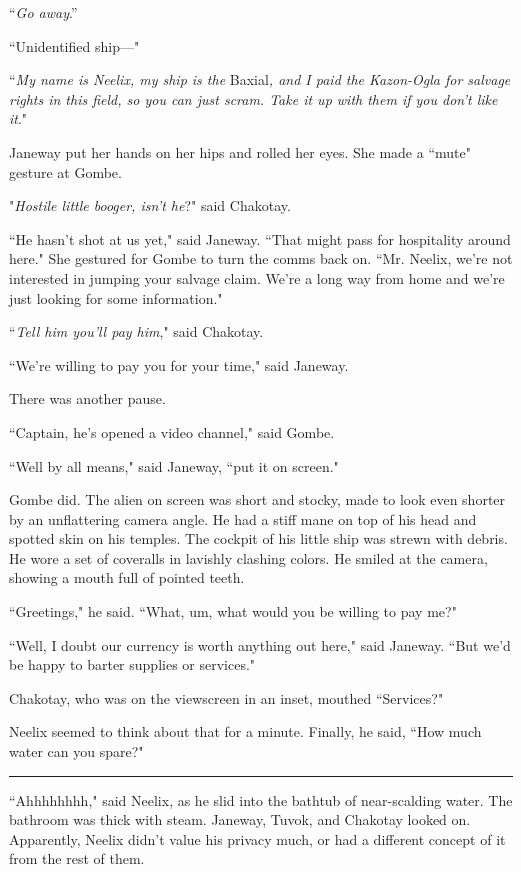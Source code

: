 \documentclass[twoside,letterpaper,12pt]{memoir}
\begin{document}
``\textit{Go away}.''

``Unidentified ship---"

``\textit{My name is Neelix, my ship is the }Baxial\textit{, and I paid the Kazon-Ogla for salvage rights in this field, so you can just scram. Take it up with them if you don't like it}."

Janeway put her hands on her hips and rolled her eyes. She made a ``mute" gesture at Gombe.

"\textit{Hostile little booger, isn't he}?" said Chakotay.

``He hasn't shot at us yet," said Janeway. ``That might pass for hospitality around here." She gestured for Gombe to turn the comms back on. ``Mr. Neelix, we're not interested in jumping your salvage claim. We're a long way from home and we're just looking for some information."

``\textit{Tell him you'll pay him}," said Chakotay.

``We're willing to pay you for your time," said Janeway.

There was another pause.

``Captain, he's opened a video channel," said Gombe.

``Well by all means," said Janeway, ``put it on screen."

Gombe did. The alien on screen was short and stocky, made to look even shorter by an unflattering camera angle. He had a stiff mane on top of his head and spotted skin on his temples. The cockpit of his little ship was strewn with debris. He wore a set of coveralls in lavishly clashing colors. He smiled at the camera, showing a mouth full of pointed teeth.

``Greetings," he said. ``What, um, what would you be willing to pay me?"

``Well, I doubt our currency is worth anything out here," said Janeway. ``But we'd be happy to barter supplies or services."

Chakotay, who was on the viewscreen in an inset, mouthed ``Services?"

Neelix seemed to think about that for a minute. Finally, he said, ``How much water can you spare?"

\begin{center}\rule{3cm}{0.4 pt}\end{center}

``Ahhhhhhhh," said Neelix, as he slid into the bathtub of near-scalding water. The bathroom was thick with steam. Janeway, Tuvok, and Chakotay looked on. Apparently, Neelix didn't value his privacy much, or had a different concept of it from the rest of them.
\end{document}
